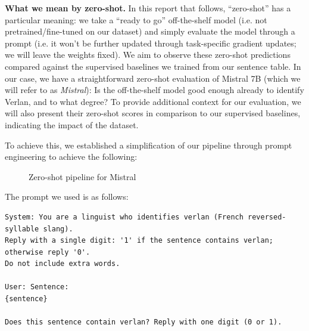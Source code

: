 \documentclass[12pt]{article}
\begin{document}
\textbf{What we mean by zero-shot.} In this report that follows, ``zero-shot'' has a particular meaning: we take a ``ready to go'' off-the-shelf model (i.e. not pretrained/fine-tuned on our dataset) and simply evaluate the model through a prompt (i.e. it won't be further updated through task-specific gradient updates; we will leave the weights fixed). We aim to observe these zero-shot predictions compared against the supervised baselines we trained from our sentence table. In our case, we have a straightforward zero-shot evaluation of Mistral 7B (which we will refer to as \textit{Mistral}): Is the off-the-shelf model good enough already to identify Verlan, and to what degree? To provide additional context for our evaluation, we will also present their zero-shot scores in comparison to our supervised baselines, indicating the impact of the dataset. 

To achieve this, we established a simplification of our pipeline through prompt engineering to achieve the following:

\begin{figure}[H]
    \centering
    \caption{Zero-shot pipeline for Mistral}
    \label{fig:mistral-zeroshot-pipeline}
\end{figure}

The prompt we used is as follows:

\lstset{
  basicstyle=\ttfamily\small,
  frame=single,
  xleftmargin=2em,
  xrightmargin=2em,
  breaklines=true
}

\begin{lstlisting}
System: You are a linguist who identifies verlan (French reversed-syllable slang).
Reply with a single digit: '1' if the sentence contains verlan; otherwise reply '0'.
Do not include extra words.

User: Sentence:
{sentence}

Does this sentence contain verlan? Reply with one digit (0 or 1).
\end{lstlisting}
\end{document}
